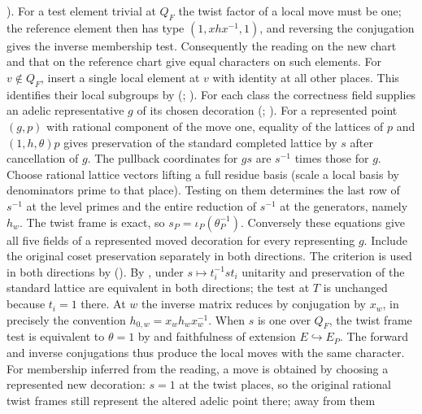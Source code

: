 ).
For a test element trivial at $Q_F$ the twist factor of a local move
must be one; the reference element then has type
$(1,xhx^{-1},1)$, and reversing the conjugation gives the inverse
membership test. Consequently the reading on the new chart and that on
the reference chart give equal characters on such elements.
For $v\notin Q_F$, insert a single local element at $v$ with identity
at all other places. This identifies their local subgroups by
(;
).
For each class the correctness field  supplies
an adelic representative $g$ of its chosen decoration
(;
). For a represented point
$(g,p)$ with rational component of the move one, equality of the
lattices of $p$ and $(1,h,\theta)p$ gives preservation of the standard
completed lattice by $s$ after cancellation of $g$. The pullback
coordinates for $gs$ are $s^{-1}$ times those for $g$. Choose rational
lattice vectors lifting a full residue basis (scale a local basis by
denominators prime to that place). Testing on them determines the last
row of $s^{-1}$ at the level primes and the entire reduction of $s^{-1}$
at the generators, namely $h_w$. The twist frame is exact, so
$s_P=\iota_P(\theta_P^{-1})$. Conversely these equations give all
five fields of a represented moved decoration for every representing
$g$. Include the original coset preservation separately in both
directions. The criterion is used in both directions by 
().
By , under
$s\mapsto t_i^{-1}s t_i$ unitarity and preservation
of the standard lattice are equivalent in both directions; the test
at $T$ is unchanged because $t_i=1$ there. At $w$ the inverse matrix
reduces by conjugation by $x_w$, in precisely the convention
$h_{0,w}=x_wh_wx_w^{-1}$. When $s$ is one over $Q_F$, the twist frame
test is equivalent to $\theta=1$ by
 and faithfulness of extension
$E\hookrightarrow E_P$. The forward and inverse conjugations thus
produce the local moves with the same character. For membership inferred
from the reading, a move is obtained by choosing a represented new
decoration: $s=1$ at the twist places, so the original rational twist
frames still represent the altered adelic point there; away from them

